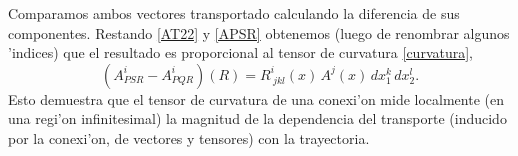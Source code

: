 %

Comparamos ambos vectores transportado calculando la diferencia de sus componentes. Restando \eqref{AT22} y \eqref{APSR} obtenemos (luego de renombrar algunos 'indices) que el resultado es proporcional al tensor de curvatura \eqref{curvatura},
\begin{equation}
\boxed{(A_{PSR}^i-A^i_{PQR})(R) =R_{\ jkl}^i(x)\, A^j(x)\,dx_1^k\,dx_2^l.} \label{19}%
\end{equation}
Esto demuestra que el tensor de curvatura de una conexi'on mide localmente (en una regi'on infinitesimal) la magnitud de la dependencia del transporte (inducido por la conexi'on, de vectores y tensores) con la trayectoria.

